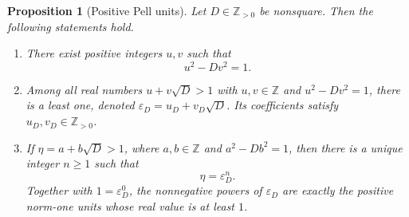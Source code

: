 \documentclass[a4paper,11pt]{amsart}
\numberwithin{equation}{section}
\newtheorem{proposition}[theorem]{Proposition}
\theoremstyle{definition}
\theoremstyle{remark}
\newcommand{\Z}{\mathbb Z}
\newcommand{\eps}{\varepsilon}
\begin{document}
\begin{proposition}[Positive Pell units]\label{prop:pell-units}
Let \(D\in\Z_{>0}\) be nonsquare.  Then the following statements hold.

\begin{enumerate}[label=\textup{(\alph*)},leftmargin=2em]
\item There exist positive integers \(u,v\) such that
\begin{equation}\label{eq:pell-existence}
 u^2-Dv^2=1.
\end{equation}

\item Among all real numbers \(u+v\sqrt D>1\) with \(u,v\in\Z\) and
\(u^2-Dv^2=1\), there is a least one, denoted
\(\eps_D=u_D+v_D\sqrt D\).  Its coefficients satisfy
\(u_D,v_D\in\Z_{>0}\).

\item If \(\eta=a+b\sqrt D>1\), where \(a,b\in\Z\) and
\(a^2-Db^2=1\), then there is a unique integer \(n\geq1\) such that
\begin{equation}\label{eq:unit-power}
 \eta=\eps_D^n.
\end{equation}
Together with \(1=\eps_D^0\), the nonnegative powers of \(\eps_D\) are
exactly the positive norm-one units whose real value is at least \(1\).
\end{enumerate}
\end{proposition}
\end{document}
